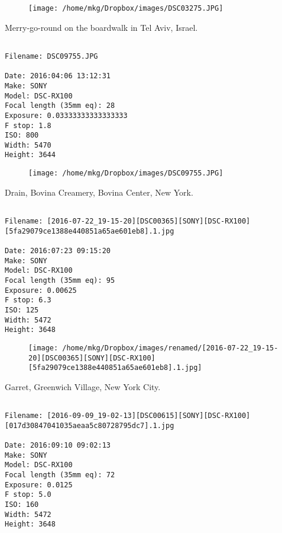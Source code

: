 \begin{figure}
\texttt{[image: /home/mkg/Dropbox/images/DSC03275.JPG]}
\end{figure}
    
\clearpage
\onecolumn
\noindent Merry-go-round on the boardwalk in Tel Aviv, Israel.
\noindent
\begin{lstlisting}

Filename: DSC09755.JPG

Date: 2016:04:06 13:12:31
Make: SONY
Model: DSC-RX100
Focal length (35mm eq): 28
Exposure: 0.03333333333333333
F stop: 1.8
ISO: 800
Width: 5470
Height: 3644
\end{lstlisting}
\clearpage

\begin{figure}
\texttt{[image: /home/mkg/Dropbox/images/DSC09755.JPG]}
\end{figure}
    
\clearpage
\onecolumn
\noindent Drain, Bovina Creamery, Bovina Center, New York.
\noindent
\begin{lstlisting}

Filename: [2016-07-22_19-15-20][DSC00365][SONY][DSC-RX100][5fa29079ce1388e440851a65ae601eb8].1.jpg

Date: 2016:07:23 09:15:20
Make: SONY
Model: DSC-RX100
Focal length (35mm eq): 95
Exposure: 0.00625
F stop: 6.3
ISO: 125
Width: 5472
Height: 3648
\end{lstlisting}
\clearpage

\begin{figure}
\texttt{[image: /home/mkg/Dropbox/images/renamed/[2016-07-22\_19-15-20][DSC00365][SONY][DSC-RX100][5fa29079ce1388e440851a65ae601eb8].1.jpg]}
\end{figure}
    
\clearpage
\onecolumn
\noindent Garret, Greenwich Village, New York City.
\noindent
\begin{lstlisting}

Filename: [2016-09-09_19-02-13][DSC00615][SONY][DSC-RX100][017d30847041035aeaa5c80728795dc7].1.jpg

Date: 2016:09:10 09:02:13
Make: SONY
Model: DSC-RX100
Focal length (35mm eq): 72
Exposure: 0.0125
F stop: 5.0
ISO: 160
Width: 5472
Height: 3648
\end{lstlisting}
\clearpage

